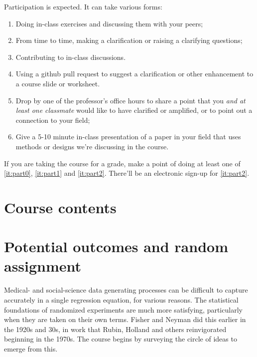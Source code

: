 \documentclass[12pt]{article}
\begin{document}
Participation is expected. It can take various forms:
\begin{enumerate}
\item Doing in-class exercises and discussing them with your peers;
\item From time to time, making a clarification or raising a clarifying questions;
\item Contributing to in-class discussions.
\item \label{it:part0} Using a github pull request to suggest a clarification or other enhancement to a course slide or worksheet.
\item \label{it:part1} Drop by one of the professor's office hours to share a point that you \textit{and at least one classmate} would like to have clarified or amplified, or to point out a connection to your field;
\item \label{it:part2} Give a 5-10 minute in-class presentation of a paper in your field that uses methods or designs we're discussing in the course.
\end{enumerate}
If you are taking the course for a grade, make a point of doing at
least one of \ref{it:part0}, \ref{it:part1} and \ref{it:part2}.  There'll be an electronic sign-up for \ref{it:part2}.


\section*{Course contents}

\section{Potential outcomes and random assignment}

Medical- and social-science data generating processes can be difficult to
capture accurately in a single regression equation, for various reasons.
The statistical foundations of randomized experiments are much more
satisfying, particularly when they are taken on their own
terms. Fisher and Neyman did this earlier in the 1920s and 30s, in
work that Rubin, Holland and others reinvigorated beginning in the
1970s. The course begins by surveying the circle of ideas to emerge
from this.
\end{document}
